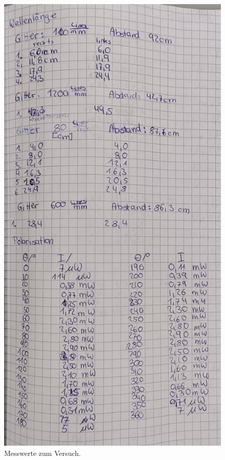 \begin{figure}[h]
    \centering
     \includegraphics[scale=0.4]{Abbildungen/Kladde2.jpg}
    \caption{Messwerte zum Versuch.}
\end{figure}
